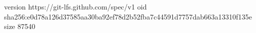 version https://git-lfs.github.com/spec/v1
oid sha256:e0d78a126d37585aa30ba92ef78d2b52fba7c44591d7757dab663a13310f135e
size 87540
